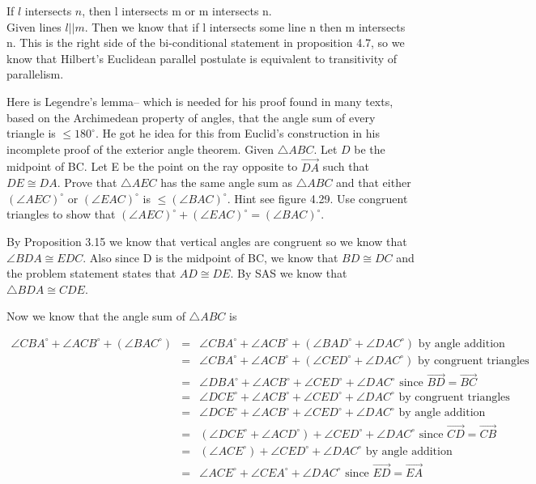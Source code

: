 \documentclass[12pt,letterpaper]{article}
\newcommand{\Proof}{\noindent {\bf Proof: }}
\newcommand{\prob}[1]{\newpage\noindent {\bf #1}}
\begin{document}
If $l$ intersects $n$, then l intersects m or m intersects n.\\

Given lines $l || m$.  Then we know that if l intersects some line n then m intersects n.  This is the right side of the bi-conditional statement in proposition 4.7, so we know that Hilbert's Euclidean parallel postulate is equivalent to transitivity of parallelism.



\prob{15} Here is Legendre's lemma-- which is needed for his proof found in many texts, based on the Archimedean property of angles, that the angle sum of every triangle is $\leq 180^\circ$.  He got he idea for this from Euclid's construction in his incomplete proof of the exterior angle theorem.  Given $\triangle ABC$.  Let $D$ be the midpoint of BC.  Let E be the point on the ray opposite to $\overrightarrow{DA}$ such that $DE \cong DA$.  Prove that $\triangle AEC$ has the same angle sum as $\triangle ABC$ and that either $(\angle AEC)^\circ$ or $(\angle EAC)^\circ$ is $\leq (\angle BAC)^\circ$.  Hint see figure 4.29.  Use congruent triangles to show that $(\angle AEC)^\circ + (\angle EAC)^\circ = (\angle BAC)^\circ$.  \\

\Proof

By Proposition 3.15 we know that vertical angles are congruent so we know that $\angle BDA \cong EDC$.  Also since D is the midpoint of BC, we know that $BD \cong DC$ and the problem statement states that $AD \cong DE$.  By SAS we know that $\triangle BDA \cong CDE$.

Now we know that the angle sum of $\triangle ABC$ is 

\begin{eqnarray*}
\angle CBA^\circ + \angle ACB^\circ + (\angle BAC^\circ) &=& \angle CBA^\circ  + \angle ACB^\circ + (\angle BAD^\circ + \angle DAC^\circ) \text{ by angle addition}\\
&=& \angle CBA^\circ  + \angle ACB^\circ + (\angle CED^\circ + \angle DAC^\circ) \text{ by congruent triangles}\\
&=& \angle DBA^\circ  + \angle ACB^\circ + \angle CED^\circ + \angle DAC^\circ \text{ since $\overrightarrow{BD} = \overrightarrow{BC}$}\\
&=& \angle DCE^\circ  + \angle ACB^\circ + \angle CED^\circ + \angle DAC^\circ \text{ by congruent triangles}\\
&=& \angle DCE^\circ  + \angle ACB^\circ + \angle CED^\circ + \angle DAC^\circ \text{ by angle addition}\\
&=& (\angle DCE^\circ  + \angle ACD^\circ) + \angle CED^\circ + \angle DAC^\circ \text{ since $\overrightarrow{CD} = \overrightarrow{CB}$}\\
&=& (\angle ACE^\circ)  + \angle CED^\circ + \angle DAC^\circ \text{ by angle addition}\\
&=& \angle ACE^\circ  + \angle CEA^\circ + \angle DAC^\circ \text{ since $\overrightarrow{ED} = \overrightarrow{EA}$}\\
\end{eqnarray*}
\end{document}

